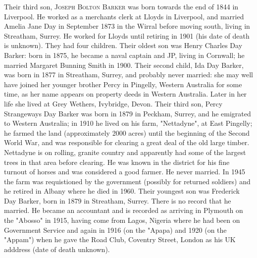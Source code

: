 Their third son, \textsc{Joseph Bolton Barker} was born towards the end of 1844 in Liverpool. He worked as a merchants clerk at Lloyds in Liverpool, and married Amelia Jane Day in September 1873 in the Wirral before moving south, living in Streatham, Surrey. He worked for Lloyds until retiring in 1901 (his date of death is unknown). They had four children. Their oldest son was Henry Charles Day Barker: born in 1875, he became a naval captain and JP, living in Cornwall; he married Margaret Bunning Smith in 1900. Their second child, Ida Day Barker,  was born in 1877 in Streatham, Surrey, and probably never married: she may well have joined her younger brother Percy in Pingelly, Western Australia for some time, as her name appears on property deeds in Western Australia. Later in her life she lived at Grey Wethers, Ivybridge, Devon. Their third son, Percy Strangeways Day Barker was born in 1879 in Peckham, Surrey, and he emigrated to Western Australia; in 1910 he lived  on his farm, "Nettadyne", at East Pingelly; he farmed the land (approximately 2000 acres) until the beginning of the Second World War, and was responsible for clearing a great deal of the old large timber. Nettadyne is on rolling, granite country and apparently had some of the largest trees in that area before clearing. He was known in the district for his fine turnout of horses and was considered a good farmer. He never married. In 1945 the farm was requistioned by the government (possibly for returned soldiers) and he retired in Albany where he died in 1960. Their youngest son was Frederick Day Barker, born in 1879 in	Streatham, Surrey. There is no record that he married. He became an accountant and is recorded as arriving in Plymouth on the "Abosso" in 1915, having come from Lagos, Nigeria where he had been on Government Service and again in 1916 (on the "Apapa) and 1920 (on the "Appam") when he gave the Road Club, Coventry Street, London as his UK adddress (date of death unknown).



